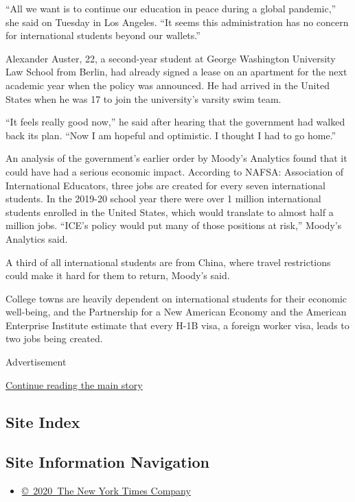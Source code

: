``All we want is to continue our education in peace during a global
pandemic,'' she said on Tuesday in Los Angeles. ``It seems this
administration has no concern for international students beyond our
wallets.''

Alexander Auster, 22, a second-year student at George Washington
University Law School from Berlin, had already signed a lease on an
apartment for the next academic year when the policy was announced. He
had arrived in the United States when he was 17 to join the university's
varsity swim team.

``It feels really good now,'' he said after hearing that the government
had walked back its plan. ``Now I am hopeful and optimistic. I thought I
had to go home.''

An analysis of the government's earlier order by Moody's Analytics found
that it could have had a serious economic impact. According to NAFSA:
Association of International Educators, three jobs are created for every
seven international students. In the 2019-20 school year there were over
1 million international students enrolled in the United States, which
would translate to almost half a million jobs. ``ICE's policy would put
many of those positions at risk,'' Moody's Analytics said.

A third of all international students are from China, where travel
restrictions could make it hard for them to return, Moody's said.

College towns are heavily dependent on international students for their
economic well-being, and the Partnership for a New American Economy and
the American Enterprise Institute estimate that every H-1B visa, a
foreign worker visa, leads to two jobs being created.

Advertisement

\protect\hyperlink{after-bottom}{Continue reading the main story}

\hypertarget{site-index}{%
\subsection{Site Index}\label{site-index}}

\hypertarget{site-information-navigation}{%
\subsection{Site Information
Navigation}\label{site-information-navigation}}

\begin{itemize}
\tightlist
\item
  \href{https://help.nytimes.com/hc/en-us/articles/115014792127-Copyright-notice}{©~2020~The
  New York Times Company}
\end{itemize}

